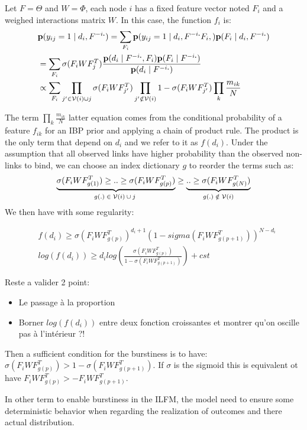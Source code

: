 Let $F=\Theta$ and $W=\Phi$, each node $i$ has a fixed feature vector noted $F_i$ and a weighed interactions matrix $W$. In this case, the function $f_i$ is:
\begin{align}
&\mathbf{p}(y_{ij}=1 \mid d_i, F^{-i\bm{.}}) = \sum_{F_i} \mathbf{p}(y_{ij}=1 \mid d_i, F^{-i\bm{.}} F_i,) \mathbf{p}(F_i \mid d_i, F^{-i\bm{.}}) \\
&= \sum_{F_i} \sigma(F_iWF_j^T) \frac{\mathbf{p}(d_i \mid F^{-i\bm{.}}, F_i) \mathbf{p}(F_i\mid F^{-i\bm{.}}) }{\mathbf{p}(d_i\mid F^{-i\bm{.}})}\\
&\propto \sum_{F_i} \prod_{j' \in \mathcal{V}(i) \cup {j}} \sigma(F_iWF_{j'}^T)\prod_{j' \notin \mathcal{V}(i)} 1-\sigma(F_iWF_{j'}^T) \prod_k \frac{m_{ik}}{N}
\end{align}

The term $\prod_k \frac{m_{ik}}{N}$ latter equation comes from the conditional probability of a feature $f_{ik}$ for an IBP prior and applying a chain of product rule. The product is the only term that depend on $d_i$ and we refer to it as $f(d_i)$.
Under the assumption that all observed links have higher probability than the observed non-links to bind, we can choose an index dictionary $g$ to reorder the terms such as:
\begin{equation}
\underbrace{\sigma(F_iWF_{g(1)}^T) \geq .. \geq\sigma(F_iWF_{g(p)}^T) }_\textnormal{$g(.) \in \mathcal{V}(i) \cup {j}$ }\geq \underbrace{ .. \geq \sigma(F_iWF_{g(N)}^T)}_\textnormal{$g(.) \notin \mathcal{V}(i)$}
\end{equation}
We then have with some regularity:

\begin{align}
&f(d_i)\geq \sigma(F_iWF_{g(p)}^T)^{d_i +1} (1 - sigma(F_iWF_{g(p+1)}^T))^{N - d_i} \\
&log(f(d_i)) \geq d_i log(\frac{\sigma(F_iWF_{g(p)}^T)}{1-  \sigma(F_iWF_{g(p+1)}^T)}) + cst
\end{align}


Reste a valider 2 point:
\begin{itemize}
	\item Le passage à la proportion
	\item Borner $log(f(d_i))$ entre deux fonction croissantes et montrer qu'on oscille pas à l'intérieur ?!
\end{itemize}

Then a sufficient condition for the burstiness is to have: $\sigma(F_iWF_{g(p)}^T) > 1- \sigma(F_iWF_{g(p+1)}^T)$. If $\sigma$ is the sigmoid this is equivalent ot have $F_iWF_{g(p)}^T > - F_iWF_{g(p+1)}^T$. 

In other term to enable burstiness in the ILFM, the model need to ensure some deterministic behavior when regarding the realization of outcomes and there actual distribution.

